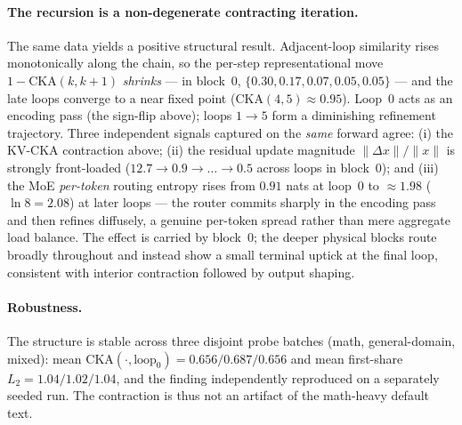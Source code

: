 \documentclass[11pt,twocolumn]{article}
\begin{document}
\paragraph{The recursion is a non-degenerate contracting iteration.} The same
data yields a positive structural result. Adjacent-loop similarity rises
monotonically along the chain, so the per-step representational move
$1-\mathrm{CKA}(k,k{+}1)$ \emph{shrinks} --- in block~0,
$\{0.30, 0.17, 0.07, 0.05, 0.05\}$ --- and the late loops converge to a near
fixed point ($\mathrm{CKA}(4,5)\!\approx\!0.95$). Loop~0 acts as an encoding pass
(the sign-flip above); loops $1{\to}5$ form a diminishing refinement trajectory.
Three independent signals captured on the \emph{same} forward agree: (i) the
KV-CKA contraction above; (ii) the residual update magnitude
$\lVert\Delta x\rVert/\lVert x\rVert$ is strongly front-loaded
($12.7 \to 0.9 \to \dots \to 0.5$ across loops in block~0); and (iii) the MoE
\emph{per-token} routing entropy rises from $0.91$ nats at loop~0 to
$\approx\!1.98$ ($\ln 8 = 2.08$) at later loops --- the router commits sharply in
the encoding pass and then refines diffusely, a genuine per-token spread rather
than mere aggregate load balance. The effect is carried by block~0; the deeper
physical blocks route broadly throughout and instead show a small terminal
uptick at the final loop, consistent with interior contraction followed by
output shaping.

\paragraph{Robustness.} The structure is stable across three disjoint probe
batches (math, general-domain, mixed): mean $\mathrm{CKA}(\cdot,\text{loop}_0) =
0.656 / 0.687 / 0.656$ and mean first-share $L_2 = 1.04 / 1.02 / 1.04$, and the
finding independently reproduced on a separately seeded run. The contraction is
thus not an artifact of the math-heavy default text.
\end{document}
